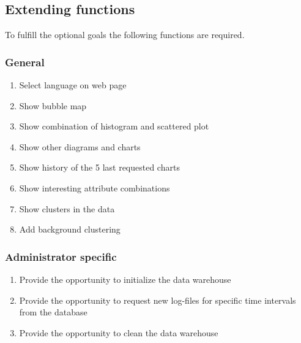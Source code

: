 \subsection{Extending functions}

To fulfill the optional goals the following functions are required.

\subsubsection*{General}
\begin{enumerate}[resume*=func]
  
  \item Select language on web page \label{f22}
  
  \item Show bubble map \label{f23} %
  
  \item Show combination of histogram and scattered plot \label{f24}
  
  \item Show other diagrams and charts \label{f25}
  
  \item Show history of the 5 last requested charts \label{f26}
  \item Show interesting attribute combinations

  \item Show clusters in the data
  
  \item Add background clustering
  


 
\end{enumerate}


\subsubsection*{Administrator specific}

\begin{enumerate}[resume*=func]
   
  \item Provide the opportunity to initialize the data warehouse\label{f27}
   
  \item Provide the opportunity to request new log-files for specific time intervals
  	from the database \label{f28}
  
  \item Provide the opportunity to clean the data warehouse \label{f29}
   
\end{enumerate}


